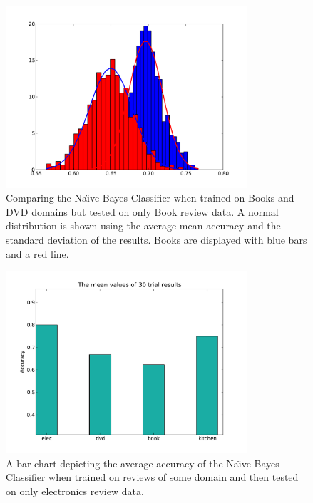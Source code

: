 \documentclass{llncs}
\begin{document}
\begin{figure}
    \centering
    \includegraphics[width=0.8\textwidth]{crossdomain_book_nb_bookONdvd.pdf}
    \caption{Comparing the Na\"\i ve Bayes Classifier when trained on Books and DVD domains but tested on only Book review data. A normal distribution is shown using the average mean accuracy and the standard deviation of the results. Books are displayed with blue bars and a red line.}
    \label{fig:book_on_dvd}
\end{figure}

\begin{figure}
    \centering
    \includegraphics[width=0.8\textwidth]{crossdomain_elec_nb.pdf}
    \caption{A bar chart depicting the average accuracy of the Na\"\i ve Bayes Classifier when trained on reviews of some domain and then tested on only electronics review data.}
    \label{fig:elec_crossdomain}
\end{figure}
\end{document}
